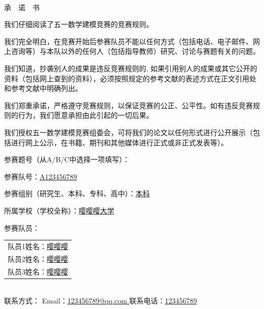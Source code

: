 \documentclass{ctexart}
\begin{document}
\thispagestyle{empty}
    \\
    \bigskip 
    {\yahei{}承\ \ 诺\ \ 书}
    
    \medskip
    \raggedright{
    我们仔细阅读了五一数学建模竞赛的竞赛规则。
    
    我们完全明白，在竞赛开始后参赛队员不能以任何方式（包括电话、电子邮件、网上咨询等）与本队以外的任何人（包括指导教师）研究、讨论与赛题有关的问题。
    
    我们知道，抄袭别人的成果是违反竞赛规则的, 如果引用别人的成果或其它公开的资料（包括网上查到的资料），必须按照规定的参考文献的表述方式在正文引用处和参考文献中明确列出。
    
    我们郑重承诺，严格遵守竞赛规则，以保证竞赛的公正、公平性。如有违反竞赛规则的行为，我们愿意承担由此引起的一切后果。
    
    我们授权五一数学建模竞赛组委会，可将我们的论文以任何形式进行公开展示（包括进行网上公示，在书籍、期刊和其他媒体进行正式或非正式发表等）。
    
    参赛题号（从A/B/C中选择一项填写）：\underline{\hspace{11.7pc}}
    
    参赛队号：\underline{\hspace{10pc}A123456789\hspace{10pc}}
    
    参赛组别（研究生、本科、专科、高中）：\underline{\hspace{4.75pc}本科\hspace{4.75pc}}
    
    所属学校（学校全称）：\underline{\hspace{6.75pc}嘤嘤嘤大学\hspace{6.75pc}}
    
    参赛队员：
    \begin{tabular}[t]{c}
    	队员1姓名：\underline{\hspace{4pc}嘤嘤嘤\hspace{4pc}}\\
    	队员2姓名：\underline{\hspace{4pc}嘤嘤嘤\hspace{4pc}}\\
    	队员3姓名：\underline{\hspace{4pc}嘤嘤嘤\hspace{4pc}}
    \end{tabular}\\
    联系方式： Email：\underline{\hspace{2pc}123456789@qq.com   \hspace{2pc}}联系电话：\underline{\hspace{2pc}123456789\hspace{2pc}}
    }
\end{document}
